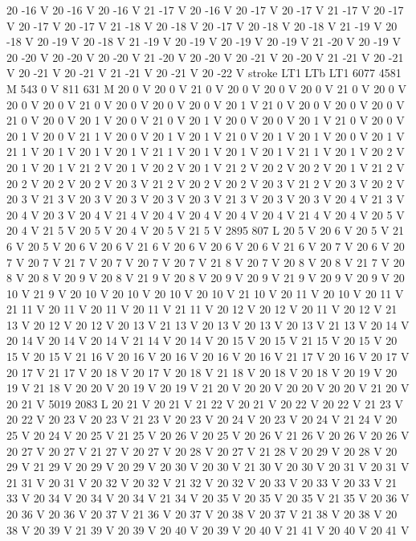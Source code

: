 {{{{{20 -16 V
20 -16 V
20 -16 V
21 -17 V
20 -16 V
20 -17 V
20 -17 V
21 -17 V
20 -17 V
20 -17 V
20 -17 V
21 -18 V
20 -18 V
20 -17 V
20 -18 V
20 -18 V
21 -19 V
20 -18 V
20 -19 V
20 -18 V
21 -19 V
20 -19 V
20 -19 V
20 -19 V
21 -20 V
20 -19 V
20 -20 V
20 -20 V
20 -20 V
21 -20 V
20 -20 V
20 -21 V
20 -20 V
21 -21 V
20 -21 V
20 -21 V
20 -21 V
21 -21 V
20 -21 V
20 -22 V
stroke
LT1
LTb
LT1
6077 4581 M
543 0 V
811 631 M
20 0 V
20 0 V
21 0 V
20 0 V
20 0 V
20 0 V
21 0 V
20 0 V
20 0 V
20 0 V
21 0 V
20 0 V
20 0 V
20 0 V
20 1 V
21 0 V
20 0 V
20 0 V
20 0 V
21 0 V
20 0 V
20 1 V
20 0 V
21 0 V
20 1 V
20 0 V
20 0 V
20 1 V
21 0 V
20 0 V
20 1 V
20 0 V
21 1 V
20 0 V
20 1 V
20 1 V
21 0 V
20 1 V
20 1 V
20 0 V
20 1 V
21 1 V
20 1 V
20 1 V
20 1 V
21 1 V
20 1 V
20 1 V
20 1 V
21 1 V
20 1 V
20 2 V
20 1 V
20 1 V
21 2 V
20 1 V
20 2 V
20 1 V
21 2 V
20 2 V
20 2 V
20 1 V
21 2 V
20 2 V
20 2 V
20 2 V
20 3 V
21 2 V
20 2 V
20 2 V
20 3 V
21 2 V
20 3 V
20 2 V
20 3 V
21 3 V
20 3 V
20 3 V
20 3 V
20 3 V
21 3 V
20 3 V
20 3 V
20 4 V
21 3 V
20 4 V
20 3 V
20 4 V
21 4 V
20 4 V
20 4 V
20 4 V
20 4 V
21 4 V
20 4 V
20 5 V
20 4 V
21 5 V
20 5 V
20 4 V
20 5 V
21 5 V
2895 807 L
20 5 V
20 6 V
20 5 V
21 6 V
20 5 V
20 6 V
20 6 V
21 6 V
20 6 V
20 6 V
20 6 V
21 6 V
20 7 V
20 6 V
20 7 V
20 7 V
21 7 V
20 7 V
20 7 V
20 7 V
21 8 V
20 7 V
20 8 V
20 8 V
21 7 V
20 8 V
20 8 V
20 9 V
20 8 V
21 9 V
20 8 V
20 9 V
20 9 V
21 9 V
20 9 V
20 9 V
20 10 V
21 9 V
20 10 V
20 10 V
20 10 V
20 10 V
21 10 V
20 11 V
20 10 V
20 11 V
21 11 V
20 11 V
20 11 V
20 11 V
21 11 V
20 12 V
20 12 V
20 11 V
20 12 V
21 13 V
20 12 V
20 12 V
20 13 V
21 13 V
20 13 V
20 13 V
20 13 V
21 13 V
20 14 V
20 14 V
20 14 V
20 14 V
21 14 V
20 14 V
20 15 V
20 15 V
21 15 V
20 15 V
20 15 V
20 15 V
21 16 V
20 16 V
20 16 V
20 16 V
20 16 V
21 17 V
20 16 V
20 17 V
20 17 V
21 17 V
20 18 V
20 17 V
20 18 V
21 18 V
20 18 V
20 18 V
20 19 V
20 19 V
21 18 V
20 20 V
20 19 V
20 19 V
21 20 V
20 20 V
20 20 V
20 20 V
21 20 V
20 21 V
5019 2083 L
20 21 V
20 21 V
21 22 V
20 21 V
20 22 V
20 22 V
21 23 V
20 22 V
20 23 V
20 23 V
21 23 V
20 23 V
20 24 V
20 23 V
20 24 V
21 24 V
20 25 V
20 24 V
20 25 V
21 25 V
20 26 V
20 25 V
20 26 V
21 26 V
20 26 V
20 26 V
20 27 V
20 27 V
21 27 V
20 27 V
20 28 V
20 27 V
21 28 V
20 29 V
20 28 V
20 29 V
21 29 V
20 29 V
20 29 V
20 30 V
20 30 V
21 30 V
20 30 V
20 31 V
20 31 V
21 31 V
20 31 V
20 32 V
20 32 V
21 32 V
20 32 V
20 33 V
20 33 V
20 33 V
21 33 V
20 34 V
20 34 V
20 34 V
21 34 V
20 35 V
20 35 V
20 35 V
21 35 V
20 36 V
20 36 V
20 36 V
20 37 V
21 36 V
20 37 V
20 38 V
20 37 V
21 38 V
20 38 V
20 38 V
20 39 V
21 39 V
20 39 V
20 40 V
20 39 V
20 40 V
21 41 V
20 40 V
20 41 V
}}}}}
